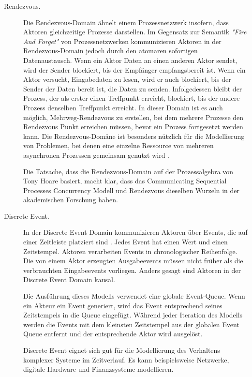 \begin{description}
\begin{description}
		\item[Rendezvous.] Die Rendezvous-Domain ähnelt einem Prozessnetzwerk insofern, dass Aktoren gleichzeitige Prozesse darstellen. Im Gegensatz zur Semantik \textit{"Fire And Forget"} von Prozessnetzwerken kommunizieren Aktoren in der Rendezvous-Domain jedoch durch den atomaren sofortigen Datenaustausch. Wenn ein Aktor Daten an einen anderen Aktor sendet, wird der Sender blockiert, bis der Empfänger empfangsbereit ist. Wenn ein Aktor versucht, Eingabedaten zu lesen, wird er auch blockiert, bis der Sender der Daten bereit ist, die Daten zu senden. Infolgedessen bleibt der Prozess, der als erster einen Treffpunkt erreicht, blockiert, bis der andere Prozess denselben Treffpunkt erreicht. In dieser Domain ist es auch möglich, Mehrweg-Rendezvous zu erstellen, bei dem mehrere Prozesse den Rendezvous Punkt erreichen müssen, bevor ein Prozess fortgesetzt werden kann. Die Rendezvous-Domäne ist besonders nützlich für die Modellierung von Problemen, bei denen eine einzelne Ressource von mehreren asynchronen Prozessen gemeinsam genutzt wird \cite{Brooks05heterogeneousconcurrent}.
		
		Die Tatsache, dass die Rendezvous-Domain auf der Prozessalgebra von Tony Hoare basiert, macht klar, dass das Communicating Sequential Processes Concurrency Modell und Rendezvous dieselben Wurzeln in der akademischen Forschung haben.
		
		\item[Discrete Event.] In der Discrete Event Domain kommunizieren Aktoren über Events, die auf einer Zeitleiste platziert sind \cite{Brooks05heterogeneousconcurrent}. Jedes Event hat einen Wert und einen Zeitstempel. Aktoren verarbeiten Events in chronologischer Reihenfolge. Die von einem Aktor erzeugten Ausgabeevents müssen nicht früher als die verbrauchten Eingabeevents vorliegen. Anders gesagt sind Aktoren in der Discrete Event Domain kausal.
		
		Die Ausführung dieses Modells verwendet eine globale Event-Queue. Wenn ein Akteur ein Event generiert, wird das Event entsprechend seines Zeitstempels in die Queue eingefügt. Während jeder Iteration des Modells werden die Events mit dem kleinsten Zeitstempel aus der globalen Event Queue entfernt und der entsprechende Aktor wird ausgelöst.
		
		Discrete Event eignet sich gut für die Modellierung des Verhaltens komplexer Systeme im Zeitverlauf. Es kann beispielsweise Netzwerke, digitale Hardware und Finanzsysteme modellieren.
	\end{description}
\end{description}


